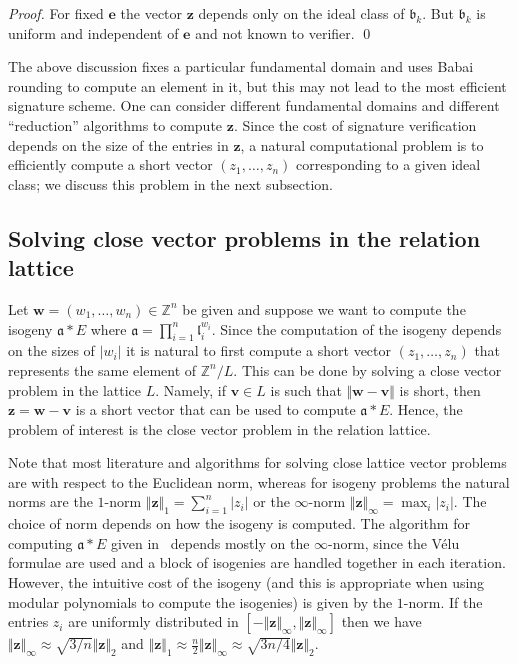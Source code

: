 \documentclass{llncs}
\newcommand{\Z}{\mathbb{Z}}
\renewcommand{\a}{\mathfrak{a}}
\renewcommand{\b}{\mathfrak{b}}
\renewcommand{\l}{\mathfrak{l}}
\newcommand{\e}{\mathbf{e}}
\renewcommand{\v}{\mathbf{v}}
\newcommand{\w}{\mathbf{w}}
\newcommand{\z}{\mathbf{z}}
\begin{document}
\begin{proof}
For fixed $\e$ the vector $\z$ depends only on the ideal class of $\b_k$.
But $\b_k$ is uniform and independent of $\e$ and not known to verifier. \qed
\end{proof}



The above discussion fixes a particular fundamental domain and uses Babai rounding to compute an element in it, but this may not lead to the most efficient signature scheme.
One can consider different fundamental domains and different ``reduction'' algorithms to compute $\z$. 
Since the cost of signature verification depends on the size of the entries in $\z$, a natural computational problem is to efficiently compute a short vector $(z_1, \dots, z_n)$ corresponding to a given ideal class; we discuss this problem in the next subsection.



\subsection{Solving close vector problems in the relation lattice}


Let $\w = (w_1, \dots, w_n ) \in \Z^n$ be given and suppose we want to compute the isogeny $\a * E$ where $\a = \prod_{i=1}^n \l_i^{w_i}$. Since the computation of the isogeny depends on the sizes of $|w_i|$ it is natural to first compute a short vector $(z_1, \dots, z_n)$ that represents the same element of $\Z^n / L$.
This can be done by solving a close vector problem in the lattice $L$. 
Namely, if $\v \in L$ is such that $\Vert \w - \v \Vert$ is short, then $\z = \w - \v$ is a short vector that can be used to compute $\a * E$.
Hence, the problem of interest is the close vector problem in the relation lattice.

Note that most literature and algorithms for solving close lattice vector problems are with respect to the Euclidean norm, whereas for isogeny problems the natural norms are the $1$-norm $\Vert \z \Vert_1  = \sum_{i=1}^n | z_i |$ or the $\infty$-norm $\Vert \z \Vert_\infty = \max_i | z_i |$.
The choice of norm depends on how the isogeny is computed. The algorithm for computing $\a * E$ given in~\cite{CLMPR18} depends mostly on the $\infty$-norm, since the V{\'e}lu formulae are used and a block of isogenies are handled together in each iteration.
However, the intuitive cost of the isogeny (and this is appropriate when using modular polynomials to compute the isogenies) is given by the $1$-norm.
If the entries $z_i$ are uniformly distributed in $[ -\Vert \z \Vert_\infty , \Vert \z \Vert_\infty ]$ then we have  $ \Vert \z \Vert_\infty \approx \sqrt{3/n} \Vert \z \Vert_2$ and $\Vert \z \Vert_1 \approx \tfrac{n}{2} \Vert \z \Vert_\infty  \approx \sqrt{3n/4} \Vert \z \Vert_2$.
\end{document}
